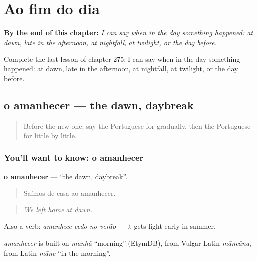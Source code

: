 
\chapter{Ao fim do dia}
\label{ch:pt-ao-fim-do-dia}

\begin{chapteropening}
\textbf{By the end of this chapter:} \emph{I can say when in the day something happened: at dawn, late in the afternoon, at nightfall, at twilight, or the day before.}

Complete the last lesson of chapter 275: I can say when in the day something happened: at dawn, late in the afternoon, at nightfall, at twilight, or the day before.
\end{chapteropening}

\section[o amanhecer]{o amanhecer — the dawn, daybreak}

\label{lesson:PT-C275-amanhecer}



\begin{quote}
Before the new one: say the Portuguese for gradually, then the Portuguese for little by little.
\end{quote}

\subsection*{You'll want to know: o amanhecer}
\textbf{o amanhecer} — \textquotedblleft{}the dawn, daybreak\textquotedblright{}.

\begin{quote}
Saímos de casa ao amanhecer.
\end{quote}

\begin{quote}
\emph{We left home at dawn.}
\end{quote}

Also a verb: \emph{amanhece cedo no verão} — it gets light early in summer.

\begin{cousinweb}
\emph{amanhecer} is built on \emph{manhã} \textquotedblleft{}morning\textquotedblright{} (EtymDB), from Vulgar Latin \emph{māneāna}, from Latin \emph{māne} \textquotedblleft{}in the morning\textquotedblright{}.
\end{cousinweb}

